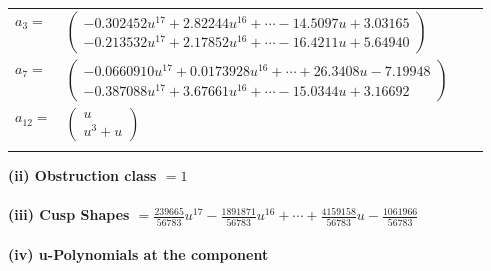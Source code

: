 \documentclass[1p]{elsarticle_modified}
\theoremstyle{definition}
\begin{document}
\begin{tabular}{m{7pt} m{180pt} m{7pt} m{180pt} }
\flushright $a_{3}=$&$\begin{pmatrix}-0.302452 u^{17}+2.82244 u^{16}+\cdots-14.5097 u+3.03165\\-0.213532 u^{17}+2.17852 u^{16}+\cdots-16.4211 u+5.64940\end{pmatrix}$ \\
\flushright $a_{7}=$&$\begin{pmatrix}-0.0660910 u^{17}+0.0173928 u^{16}+\cdots+26.3408 u-7.19948\\-0.387088 u^{17}+3.67661 u^{16}+\cdots-15.0344 u+3.16692\end{pmatrix}$ \\
\flushright $a_{12}=$&$\begin{pmatrix}u\\u^3+u\end{pmatrix}$\\&\end{tabular}
\flushleft \textbf{(ii) Obstruction class $= 1$}\\~\\
\flushleft \textbf{(iii) Cusp Shapes $= \frac{239665}{56783} u^{17}-\frac{1891871}{56783} u^{16}+\cdots+\frac{4159158}{56783} u-\frac{1061966}{56783}$}\\~\\
\newpage\renewcommand{\arraystretch}{1}
\flushleft \textbf{(iv) u-Polynomials at the component}\newline \\
\end{document}
